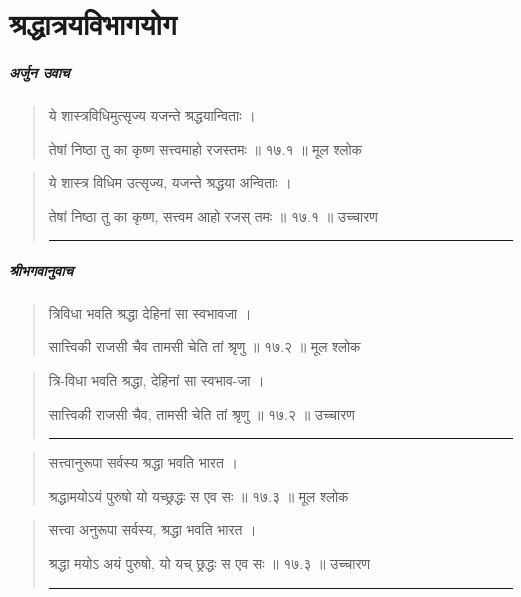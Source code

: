 \chapter{\sanskrit  श्रद्धात्रयविभागयोग} 
\paragraph{\sanskrit अर्जुन उवाच}
\begin{quotation} 
ये शास्त्रविधिमुत्सृज्य यजन्ते श्रद्धयान्विताः ।  

तेषां निष्ठा तु का कृष्ण सत्त्वमाहो रजस्तमः  ॥ १७.१ ॥  मूल श्लोक
\end{quotation}

\begin{quotation}

ये शास्त्र विधिम उत्सृज्य, यजन्ते श्रद्धया अन्विताः ।  

तेषां निष्ठा तु का कृष्ण, सत्त्वम आहो रजस् तमः  ॥ १७.१ ॥  उच्चारण

\noindent\rule{16cm}{0.4pt} 
\end{quotation}

\paragraph{\sanskrit श्रीभगवानुवाच}

\begin{quotation}


त्रिविधा भवति श्रद्धा देहिनां सा स्वभावजा ।  

सात्त्विकी राजसी चैव तामसी चेति तां श्रृणु  ॥ १७.२ ॥  मूल श्लोक
\end{quotation}

\begin{quotation}

त्रि-विधा भवति श्रद्धा, देहिनां सा स्वभाव-जा ।  

सात्त्विकी राजसी चैव, तामसी चेति तां श्रृणु  ॥ १७.२ ॥  उच्चारण

\noindent\rule{16cm}{0.4pt} 
\end{quotation}


\begin{quotation}

सत्त्वानुरूपा सर्वस्य श्रद्धा भवति भारत ।  

श्रद्धामयोऽयं पुरुषो यो यच्छ्रद्धः स एव सः  ॥ १७.३ ॥  मूल श्लोक
\end{quotation}

\begin{quotation}

सत्त्वा अनुरूपा सर्वस्य, श्रद्धा भवति भारत ।  

श्रद्धा मयोऽ अयं पुरुषो, यो यच् छ्रद्धः स एव सः  ॥ १७.३ ॥  उच्चारण

\noindent\rule{16cm}{0.4pt} 
\end{quotation}


